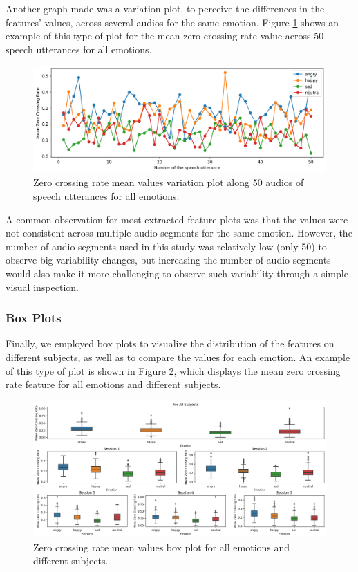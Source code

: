 Another graph made was a variation plot, to perceive the differences in the features' values, across several audios for the same emotion. Figure \ref{fig:zcrMeanVar} shows an example of this type of plot for the mean zero crossing rate value across 50 speech utterances for all emotions.

\begin{figure}[H]
	\centering
	\includegraphics[width=\linewidth]{figs/4_1_traditional/meanZCRVar.png}
	\caption{Zero crossing rate mean values variation plot along 50 audios of speech utterances for all emotions.}
	\label{fig:zcrMeanVar}
\end{figure}

A common observation for most extracted feature plots was that the values were not consistent across multiple audio segments for the same emotion. However, the number of audio segments used in this study was relatively low (only 50) to observe big variability changes, but increasing the number of audio segments would also make it more challenging to observe such variability through a simple visual inspection.

\subsubsection{Box Plots}

Finally, we employed box plots to visualize the distribution of the features on different subjects, as well as to compare the values for each emotion. An example of this type of plot is shown in Figure \ref{fig:zcrMeanBoxPlot}, which displays the mean zero crossing rate feature for all emotions and different subjects. 

\begin{figure}[H]
	\centering
	\includegraphics[width=\linewidth]{figs/4_1_traditional/mean_zcr_box_plot.png}
	\caption{Zero crossing rate mean values box plot for all emotions and different subjects.}
	\label{fig:zcrMeanBoxPlot}
\end{figure}

